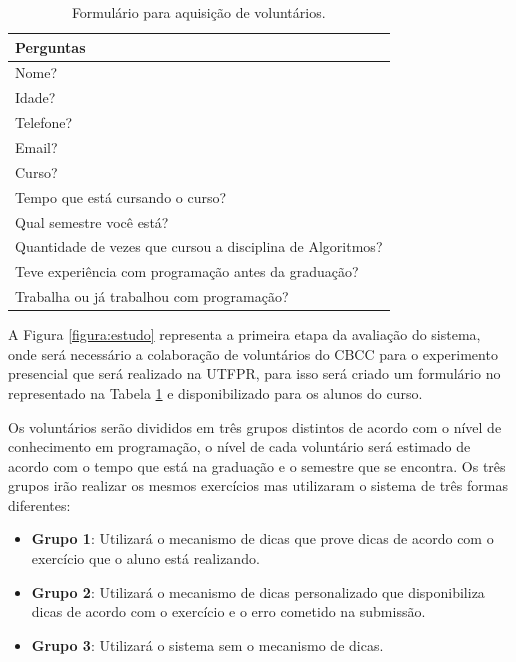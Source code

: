 \begin{table}[ht]
	\centering
	\captionsetup{justification=centering}
	\caption{Formulário para aquisição de voluntários.}
	\label{tabela:formulário}
	\begin{tabular}{l}
		\hline
		Perguntas                        \\ \hline
		Nome?                            \\
		Idade?                           \\
		Telefone?                        \\
		Email?                           \\
		Curso?                           \\
		Tempo que está cursando o curso? \\
		Qual semestre você está?         \\ 
		Quantidade de vezes que cursou a disciplina de Algoritmos?  \\ 
		Teve experiência com programação antes da graduação? \\
		Trabalha ou já trabalhou com programação? \\ \hline
	\end{tabular}
\end{table}

A Figura \ref{figura:estudo} representa a primeira etapa da avaliação do sistema, onde será necessário a colaboração de voluntários do CBCC para o experimento presencial que será realizado na UTFPR, para isso será criado um formulário no  representado na Tabela \ref{tabela:formulário} e disponibilizado  para os alunos do curso.

Os voluntários serão divididos em três grupos distintos de acordo com o nível de conhecimento em programação, o nível de cada voluntário será estimado de acordo com o tempo que está na graduação e o semestre que se encontra. Os três grupos irão realizar os mesmos exercícios mas utilizaram o sistema de três formas diferentes:

\begin{itemize}
	\item \textbf{Grupo 1}: Utilizará o mecanismo de dicas que prove dicas de acordo com o exercício que o aluno está realizando.
	
	\item \textbf{Grupo 2}: Utilizará o mecanismo de dicas personalizado que disponibiliza dicas de acordo com o exercício e o erro cometido na submissão.
	
	\item \textbf{Grupo 3}: Utilizará o sistema sem o mecanismo de dicas.
\end{itemize}

